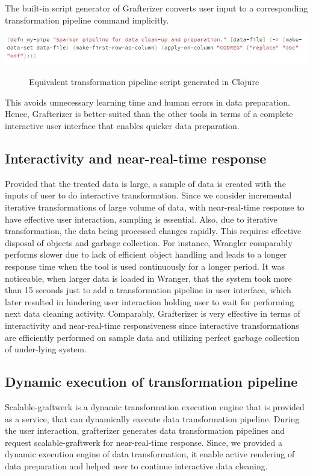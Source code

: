 The built-in script generator of Grafterizer converts user input to a corresponding transformation pipeline command implicitly.  
\begin{center}
	\includegraphics[width=38em]{./Figures/code-generated}
	\begin{figure}[htbp]
    \caption{Equivalent transformation pipeline script generated in Clojure}
    \label{fig:codegenerated}
	\end{figure}
\end{center}
This avoids unnecessary learning time and human errors in data preparation. Hence, Grafterizer is better-suited than the other tools in terms of a complete interactive user interface that enables quicker data preparation.
\subsection{Interactivity and near-real-time response}
Provided that the treated data is large, a sample of data is created with the inputs of user to do interactive transformation. Since we consider incremental iterative transformations of large volume of data, with near-real-time response to have effective user interaction, sampling is essential.  Also, due to iterative transformation, the data being processed changes rapidly. This requires effective disposal of objects and garbage collection. For instance, Wrangler comparably performs slower due to lack of efficient object handling and leads to a longer response time when the tool is used continuously for a longer period. It was noticeable, when larger data is loaded in Wranger\cite{2011-wrangler}, that the system took more than 15 seconds just to add a transformation pipeline in user interface, which later resulted in hindering user interaction holding user to wait for performing next data cleaning activity. Comparably, Grafterizer is very effective in terms of interactivity and near-real-time responsiveness since interactive transformations are efficiently performed on sample data and utilizing perfect garbage collection of under-lying system.
\subsection{Dynamic execution of transformation pipeline}
Scalable-graftwerk is a dynamic transformation execution engine that is provided as a service, that can dynamically execute data transformation pipeline. During the user interaction, grafterizer generates data transformation pipelines and request scalable-graftwerk for near-real-time response. Since, we provided a dynamic execution engine of data transformation, it enable active rendering of data preparation and helped user to continue interactive data cleaning. 
